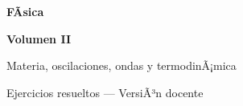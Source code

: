 ﻿\documentclass[11pt,letterpaper,openany]{book}
\newcommand{\numerovolumen}{II}
\newcommand{\nombrevolumen}{Materia, oscilaciones, ondas y termodinÃ¡mica}
\begin{document}

\begin{titlepage}

    \centering

    \vspace*{2.5cm}

    {\color{RojoPrincipal}
    \Huge\bfseries
    FÃ­sica
    \par}

    \vspace{0.8cm}

    {\color{AzulPrincipal}
    \LARGE\bfseries
    Volumen \numerovolumen
    \par}

    \vspace{0.5cm}

    {\Large
    \nombrevolumen
    \par}

    \vspace{1.5cm}

    {\color{AzulPrincipal}
    \Large
    Ejercicios resueltos --- VersiÃ³n docente
    \par}

    \vfill

    {\Large\bfseries
    \autorlibro
    \par}

    \vspace{2cm}

\end{titlepage}



\frontmatter

\tableofcontents

\cleardoublepage



\mainmatter
\end{document}
